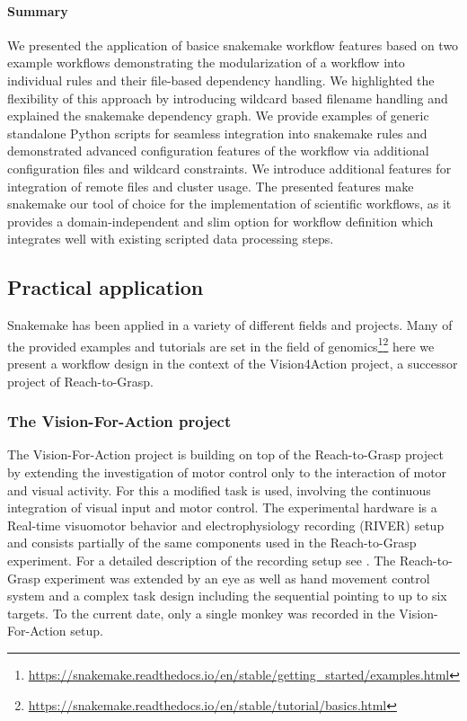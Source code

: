 \paragraph{Summary}
We presented the application of basice snakemake workflow features based on two example workflows demonstrating the modularization of a workflow into individual rules and their file-based dependency handling. We highlighted the flexibility of this approach by introducing wildcard based filename handling and explained the snakemake dependency graph. We provide examples of generic standalone Python scripts for seamless integration into snakemake rules and demonstrated advanced configuration features of the workflow via additional configuration files and wildcard constraints. We introduce additional features for integration of remote files and cluster usage.
The presented features make snakemake our tool of choice for the implementation of scientific workflows, as it provides a domain-independent and slim option for workflow definition which integrates well with existing scripted data processing steps.





\subsection{Practical application}
Snakemake has been applied in a variety of different fields and projects. Many of the provided examples and tutorials are set in the field of genomics\footnote{\url{https://snakemake.readthedocs.io/en/stable/getting_started/examples.html}}\footnote{\url{https://snakemake.readthedocs.io/en/stable/tutorial/basics.html}} here we present a workflow design in the context of the Vision4Action project, a successor project of Reach-to-Grasp.

\subsubsection{The Vision-For-Action project}
The Vision-For-Action project is building on top of the Reach-to-Grasp project by extending the investigation of motor control only to the interaction of motor and visual activity. For this a modified task is used, involving the continuous integration of visual input and motor control. The experimental hardware is a Real-time visuomotor behavior and electrophysiology recording
(RIVER) setup and consists partially of the same components used in the Reach-to-Grasp experiment. For a detailed description of the recording setup see \cite{deHaan_2018,deHaan_2018a}. The Reach-to-Grasp experiment was extended by an eye as well as hand movement control system and a complex task design including the sequential pointing to up to six targets. To the current date, only a single monkey was recorded in the Vision-For-Action setup.

